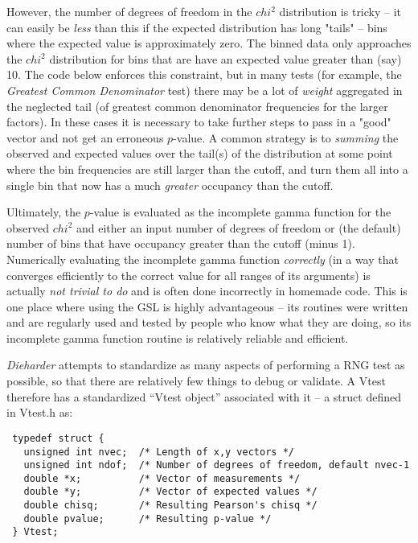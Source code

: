 \documentclass[12pt]{article}
\begin{document}
However, the number of degrees of freedom in the $chi^2$ distribution is
tricky -- it can easily be {\em less} than this if the expected
distribution has long "tails" -- bins where the expected value is
approximately zero.  The binned data only approaches the $chi^2$
distribution for bins that are have an expected value greater than (say)
10.  The code below enforces this constraint, but in many tests (for
example, the {\em Greatest Common Denominator} test) there may be a lot
of {\em weight} aggregated in the neglected tail (of greatest common
denominator frequencies for the larger factors).  In these cases it is
necessary to take further steps to pass in a "good" vector and not get
an erroneous $p$-value.  A common strategy is to {\em summing} the
observed and expected values over the tail(s) of the distribution at
some point where the bin frequencies are still larger than the cutoff,
and turn them all into a single bin that now has a much {\em greater}
occupancy than the cutoff.

Ultimately, the $p$-value is evaluated as the incomplete gamma function
for the observed $chi^2$ and either an input number of degrees of
freedom or (the default) number of bins that have occupancy greater than
the cutoff (minus 1).  Numerically evaluating the incomplete gamma
function {\em correctly} (in a way that converges efficiently to the
correct value for all ranges of its arguments) is actually {\em not
trivial to do} and is often done incorrectly in homemade code.  This is
one place where using the GSL is highly advantageous -- its routines
were written and are regularly used and tested by people who know what
they are doing, so its incomplete gamma function routine is relatively
reliable and efficient.

{\em Dieharder} attempts to standardize as many aspects of performing
a RNG test as possible, so that there are relatively few things to
debug or validate.  A Vtest therefore has a standardized ``Vtest
object'' associated with it -- a struct defined in Vtest.h as:

\begin{verbatim}
 typedef struct {
   unsigned int nvec;  /* Length of x,y vectors */
   unsigned int ndof;  /* Number of degrees of freedom, default nvec-1
   double *x;          /* Vector of measurements */
   double *y;          /* Vector of expected values */
   double chisq;       /* Resulting Pearson's chisq */
   double pvalue;      /* Resulting p-value */
 } Vtest;
\end{verbatim}
\end{document}
